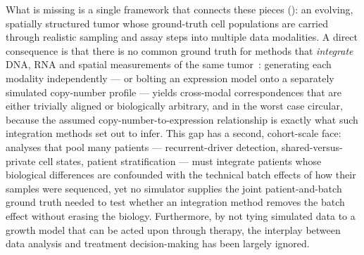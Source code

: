 \documentclass{article}
\begin{document}
What is missing is a single framework that connects these pieces (): an
evolving, spatially structured tumor whose ground-truth cell populations are carried through
realistic sampling and assay steps into multiple data modalities. A direct consequence is that there is no common
ground truth for methods that \emph{integrate} DNA, RNA and spatial measurements of the same
tumor~\cite{campbell_clonealign_2019}: generating each modality independently --- or bolting an
expression model onto a separately simulated copy-number profile --- yields cross-modal
correspondences that are either trivially aligned or biologically arbitrary, and in the worst
case circular, because the assumed copy-number-to-expression relationship is exactly what such
integration methods set out to infer. This gap has a second, cohort-scale face: analyses that
pool many patients --- recurrent-driver detection, shared-versus-private cell states, patient
stratification --- must integrate patients whose biological differences are confounded with the
technical batch effects of how their samples were sequenced, yet no simulator supplies the joint
patient-and-batch ground truth needed to test whether an integration method removes the batch
effect without erasing the biology. Furthermore, by not tying simulated data to a growth
model that can be acted upon through therapy, the interplay between data analysis and treatment
decision-making has been largely ignored.
\end{document}
